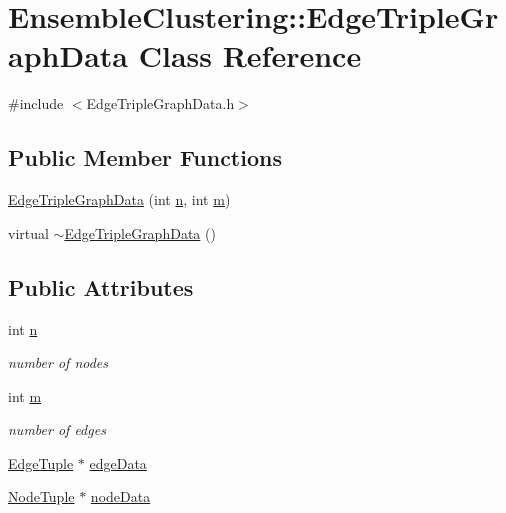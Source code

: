 \hypertarget{class_ensemble_clustering_1_1_edge_triple_graph_data}{\section{Ensemble\-Clustering\-:\-:Edge\-Triple\-Graph\-Data Class Reference}
\label{class_ensemble_clustering_1_1_edge_triple_graph_data}
}


{\ttfamily \#include $<$Edge\-Triple\-Graph\-Data.\-h$>$}

\subsection*{Public Member Functions}
\begin{DoxyCompactItemize}
\item 
\hyperlink{class_ensemble_clustering_1_1_edge_triple_graph_data_a5bd6e67c6d4cfb6fcd3e93ad43b8d895}{Edge\-Triple\-Graph\-Data} (int \hyperlink{class_ensemble_clustering_1_1_edge_triple_graph_data_a907cee0110aa331fa3c3ddd99b8deaf7}{n}, int \hyperlink{class_ensemble_clustering_1_1_edge_triple_graph_data_a5ee6e7a60111a4120f880db9ae16d0cb}{m})
\item 
virtual \hyperlink{class_ensemble_clustering_1_1_edge_triple_graph_data_ac76298b736f2e358ca0212c9c1f0ec7b}{$\sim$\-Edge\-Triple\-Graph\-Data} ()
\end{DoxyCompactItemize}
\subsection*{Public Attributes}
\begin{DoxyCompactItemize}
\item 
int \hyperlink{class_ensemble_clustering_1_1_edge_triple_graph_data_a907cee0110aa331fa3c3ddd99b8deaf7}{n}
\begin{DoxyCompactList}\small\item\em number of nodes \end{DoxyCompactList}\item 
int \hyperlink{class_ensemble_clustering_1_1_edge_triple_graph_data_a5ee6e7a60111a4120f880db9ae16d0cb}{m}
\begin{DoxyCompactList}\small\item\em number of edges \end{DoxyCompactList}\item 
\hyperlink{class_ensemble_clustering_1_1_edge_tuple}{Edge\-Tuple} $\ast$ \hyperlink{class_ensemble_clustering_1_1_edge_triple_graph_data_acb27bbd92c258f29537e2d9a94e973ea}{edge\-Data}
\item 
\hyperlink{class_ensemble_clustering_1_1_node_tuple}{Node\-Tuple} $\ast$ \hyperlink{class_ensemble_clustering_1_1_edge_triple_graph_data_ac9d42d7b576078953b3ddbae01004dd8}{node\-Data}
\end{DoxyCompactItemize}


